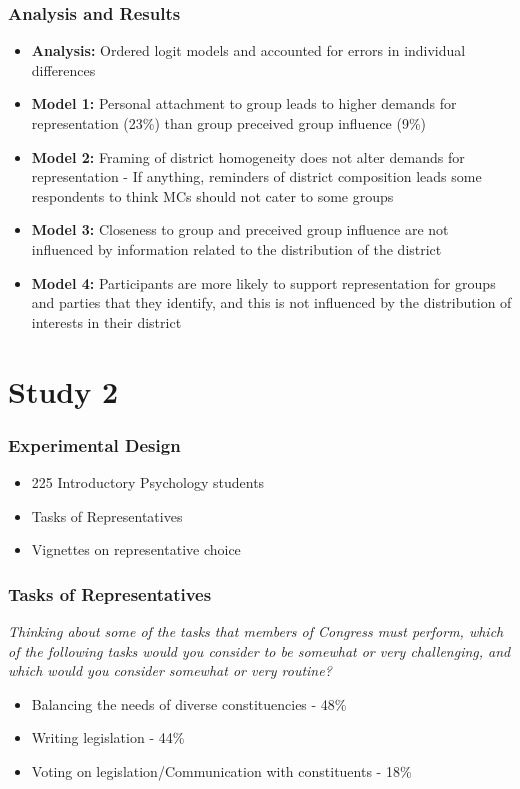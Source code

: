\documentclass[14pt]{beamer}
\newcommand\e{\emph}
\newcommand\tb{\textbf}
\begin{document}
\begin{frame}
\frametitle{Analysis and Results}
\footnotesize
\begin{itemize} \itemsep -2pt
	\item \tb{Analysis:} Ordered logit models and accounted for errors in individual differences
	\item \tb{Model 1:} Personal attachment to group leads to higher demands for representation (23\%) than group preceived group influence (9\%)
	\item \tb{Model 2:} Framing of district homogeneity does not alter demands for representation - If anything, reminders of district composition leads some respondents to think MCs should not cater to some groups
	\item \tb{Model 3:} Closeness to group and preceived group influence are not influenced by information related to the distribution of the district
	\item \tb{Model 4:} Participants are more likely to support representation for groups and parties that they identify, and this is not influenced by the distribution of interests in their district
\end{itemize}
\end{frame}


\section{Study 2}
\begin{frame}
\frametitle{Experimental Design}
\begin{itemize}
	\item 225 Introductory Psychology students
	\item Tasks of Representatives
	\item Vignettes on representative choice
\end{itemize}
\end{frame}

\begin{frame}
\frametitle{Tasks of Representatives}
\small
\begin{center}
	\e{Thinking about some of the tasks that members of Congress must perform, which of the following tasks would you consider to be somewhat or very challenging, and which would you consider somewhat or very routine?}
\end{center}
\begin{itemize}
	\item Balancing the needs of diverse constituencies - 48\% 
	\item Writing legislation - 44\%
	\item Voting on legislation/Communication with constituents - 18\%
\end{itemize}
\end{frame}
\end{document}
